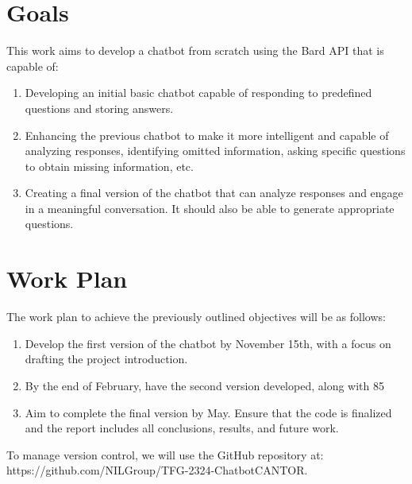 \section{Goals}
This work aims to develop a chatbot from scratch using the Bard API that is capable of:
\begin{enumerate}

\item Developing an initial basic chatbot capable of responding to predefined questions and storing answers.
\item Enhancing the previous chatbot to make it more intelligent and capable of analyzing responses, identifying omitted information, asking specific questions to obtain missing information, etc.
\item Creating a final version of the chatbot that can analyze responses and engage in a meaningful conversation. It should also be able to generate appropriate questions. 
\end{enumerate}

\section{Work Plan}

The work plan to achieve the previously outlined objectives will be as follows:
\begin{enumerate}

\item Develop the first version of the chatbot by November 15th, with a focus on drafting the project introduction.

\item By the end of February, have the second version developed, along with 85%

\item Aim to complete the final version by May. Ensure that the code is finalized and the report includes all conclusions, results, and future work.

\end{enumerate}
To manage version control, we will use the GitHub repository at: https://github.com/NILGroup/TFG-2324-ChatbotCANTOR.












